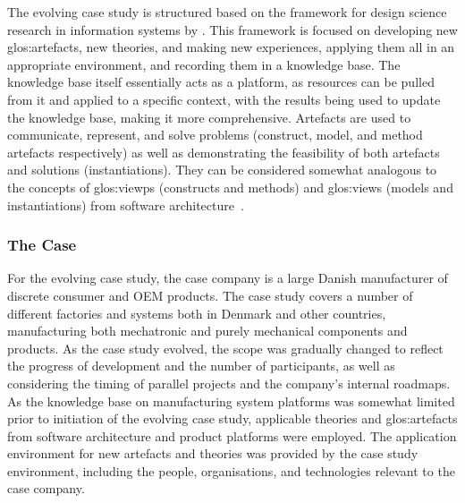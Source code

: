 The evolving case study is structured based on the framework for design science research in information systems by \textcite{10.2307/25148625}.
This framework is focused on developing new \gls{glos:artefact}s, new theories, and making new experiences, applying them all in an appropriate environment, and recording them in a knowledge base.
The knowledge base itself essentially acts as a platform, as resources can be pulled from it and applied to a specific context, with the results being used to update the knowledge base, making it more comprehensive.
Artefacts are used to communicate, represent, and solve problems (construct, model, and method artefacts respectively) as well as demonstrating the feasibility of both artefacts and solutions (instantiations).
They can be considered somewhat analogous to the concepts of \gls{glos:viewp}s (constructs and methods) and \gls{glos:view}s (models and instantiations) from software architecture~\parencite{ISO42010}.

\subsubsection*{The Case}
For the evolving case study, the case company is a large Danish manufacturer of discrete consumer and OEM products.
The case study covers a number of different factories and systems both in Denmark and other countries, manufacturing both mechatronic and purely mechanical components and products.
As the case study evolved, the scope was gradually changed to reflect the progress of development and the number of participants, as well as considering the timing of parallel projects and the company's internal roadmaps.
As the knowledge base on manufacturing system platforms was somewhat limited prior to initiation of the evolving case study, applicable theories and \gls{glos:artefact}s from software architecture and product platforms were employed.
The application environment for new artefacts and theories was provided by the case study environment, including the people, organisations, and technologies relevant to the case company.

